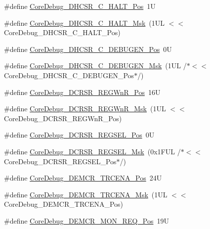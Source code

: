 \begin{DoxyCompactItemize}
\item 
\#define \hyperlink{group___c_m_s_i_s___core_debug_gaddf1d43f8857e4efc3dc4e6b15509692}{Core\+Debug\+\_\+\+D\+H\+C\+S\+R\+\_\+\+C\+\_\+\+H\+A\+L\+T\+\_\+\+Pos}~1U
\item 
\#define \hyperlink{group___c_m_s_i_s___core_debug_ga1d905a3aa594eb2e8bb78bcc4da05b3f}{Core\+Debug\+\_\+\+D\+H\+C\+S\+R\+\_\+\+C\+\_\+\+H\+A\+L\+T\+\_\+\+Msk}~(1\+U\+L $<$$<$ Core\+Debug\+\_\+\+D\+H\+C\+S\+R\+\_\+\+C\+\_\+\+H\+A\+L\+T\+\_\+\+Pos)
\item 
\#define \hyperlink{group___c_m_s_i_s___core_debug_gab557abb5b172b74d2cf44efb9d824e4e}{Core\+Debug\+\_\+\+D\+H\+C\+S\+R\+\_\+\+C\+\_\+\+D\+E\+B\+U\+G\+E\+N\+\_\+\+Pos}~0U
\item 
\#define \hyperlink{group___c_m_s_i_s___core_debug_gab815c741a4fc2a61988cd2fb7594210b}{Core\+Debug\+\_\+\+D\+H\+C\+S\+R\+\_\+\+C\+\_\+\+D\+E\+B\+U\+G\+E\+N\+\_\+\+Msk}~(1\+U\+L /$\ast$$<$$<$ Core\+Debug\+\_\+\+D\+H\+C\+S\+R\+\_\+\+C\+\_\+\+D\+E\+B\+U\+G\+E\+N\+\_\+\+Pos$\ast$/)
\item 
\#define \hyperlink{group___c_m_s_i_s___core_debug_ga51e75942fc0614bc9bb2c0e96fcdda9a}{Core\+Debug\+\_\+\+D\+C\+R\+S\+R\+\_\+\+R\+E\+G\+Wn\+R\+\_\+\+Pos}~16U
\item 
\#define \hyperlink{group___c_m_s_i_s___core_debug_ga1eef4992d8f84bc6c0dffed1c87f90a5}{Core\+Debug\+\_\+\+D\+C\+R\+S\+R\+\_\+\+R\+E\+G\+Wn\+R\+\_\+\+Msk}~(1\+U\+L $<$$<$ Core\+Debug\+\_\+\+D\+C\+R\+S\+R\+\_\+\+R\+E\+G\+Wn\+R\+\_\+\+Pos)
\item 
\#define \hyperlink{group___c_m_s_i_s___core_debug_ga52182c8a9f63a52470244c0bc2064f7b}{Core\+Debug\+\_\+\+D\+C\+R\+S\+R\+\_\+\+R\+E\+G\+S\+E\+L\+\_\+\+Pos}~0U
\item 
\#define \hyperlink{group___c_m_s_i_s___core_debug_ga17cafbd72b55030219ce5609baa7c01d}{Core\+Debug\+\_\+\+D\+C\+R\+S\+R\+\_\+\+R\+E\+G\+S\+E\+L\+\_\+\+Msk}~(0x1\+F\+U\+L /$\ast$$<$$<$ Core\+Debug\+\_\+\+D\+C\+R\+S\+R\+\_\+\+R\+E\+G\+S\+E\+L\+\_\+\+Pos$\ast$/)
\item 
\#define \hyperlink{group___c_m_s_i_s___core_debug_ga6ff2102b98f86540224819a1b767ba39}{Core\+Debug\+\_\+\+D\+E\+M\+C\+R\+\_\+\+T\+R\+C\+E\+N\+A\+\_\+\+Pos}~24U
\item 
\#define \hyperlink{group___c_m_s_i_s___core_debug_ga5e99652c1df93b441257389f49407834}{Core\+Debug\+\_\+\+D\+E\+M\+C\+R\+\_\+\+T\+R\+C\+E\+N\+A\+\_\+\+Msk}~(1\+U\+L $<$$<$ Core\+Debug\+\_\+\+D\+E\+M\+C\+R\+\_\+\+T\+R\+C\+E\+N\+A\+\_\+\+Pos)
\item 
\#define \hyperlink{group___c_m_s_i_s___core_debug_ga341020a3b7450416d72544eaf8e57a64}{Core\+Debug\+\_\+\+D\+E\+M\+C\+R\+\_\+\+M\+O\+N\+\_\+\+R\+E\+Q\+\_\+\+Pos}~19U
$$
\end{DoxyCompactItemize}
